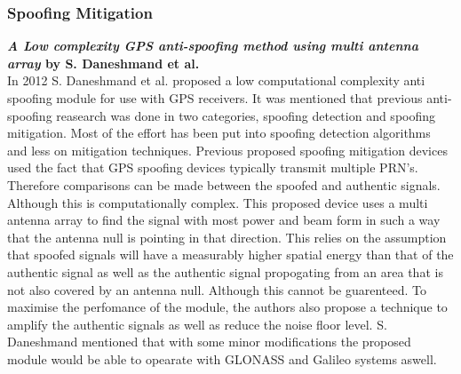 \medskip
\subsubsection{Spoofing Mitigation}

\textbf{\emph{A Low complexity GPS anti-spoofing method using multi antenna array} by S. Daneshmand et al.} \\
In 2012 S. Daneshmand et al. \cite{RN8} proposed a low computational complexity anti spoofing module for use with GPS receivers.
It was mentioned that previous anti-spoofing reasearch was done in two categories, spoofing detection and spoofing mitigation.
Most of the effort has been put into spoofing detection algorithms and less on mitigation techniques. 
Previous proposed spoofing mitigation devices used the fact that GPS spoofing devices typically transmit multiple PRN's. 
Therefore comparisons can be made between the spoofed and authentic signals. Although this is computationally complex. This proposed
device uses a multi antenna array to find the signal with most power and beam form in such a way that the antenna null is pointing in
that direction. This relies on the assumption that spoofed signals will have a measurably higher spatial energy than that of the authentic signal
as well as the authentic signal propogating from an area that is not also covered by an antenna null. Although this cannot be guarenteed.
To maximise the perfomance of the module, the authors also propose a technique to amplify the authentic signals as well as reduce the noise floor level.
S. Daneshmand mentioned that with some minor modifications the proposed module would be able to opearate with GLONASS and Galileo systems aswell. 

\medskip

